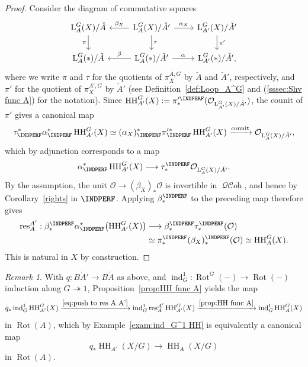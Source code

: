 \documentclass[12pt, oneside]{amsart}
\numberwithin{equation}{section}
\theoremstyle{remark}
\newtheorem{remark}[subsubsection]{Remark}
\theoremstyle{plain}
\DeclareMathOperator{\QCOH}{\mathcal{QC}\textit{oh}}
\newcommand{\Loop}{\operatorname{L}}
\newcommand{\OO}{\mathcal{O}}
\newcommand{\HH}{\operatorname{HH}}
\newcommand{\Rot}{\operatorname{Rot}}
\begin{document}
\begin{proof}
Consider the diagram of commutative squares
\[\begin{tikzcd}
  \Loop_A^G(X)/\check{A} \ar[swap]{d}{\pi}
  & \Loop_A^G(X)/\check{A}' \ar{d}{\tau}\ar[swap]{l}{\beta_X}\ar{r}{\alpha_X}
  & \Loop_{A'}^G(X)/\check{A}' \ar{d}{\pi'}
  \\
  \Loop_A^G(*)/\check{A}
  & \Loop_A^G(*)/\check{A}' \ar[swap]{l}{\beta}\ar{r}{\alpha}
  & \Loop_{A'}^G(*)/\check{A}',
\end{tikzcd}\]
where we write $\pi$ and $\tau$ for the quotients of $\pi_X^{A,G}$ by $\check{A}$ and $\check{A}'$, respectively, and $\pi'$ for the quotient of $\pi_X^{A',G}$ by $\check{A}'$ (see Definition~\ref{def:Loop_A^G} and (\ref{sssec:Shv func A}) for the notation).
Since $\HH_{A'}^G(X) := \pi'^{\INDPERF}_*(\OO_{\Loop_{A'}^G(X)/\check{A}'})$, the counit of $\pi'$ gives a canonical map
\[
  \tau^*_{\INDPERF} \alpha^*_{\INDPERF} \HH_{A'}^G(X) \simeq
  (\alpha_X)^*_{\INDPERF} \pi'^{*}_{\INDPERF} \HH_{A'}^G(X) \xrightarrow{\mathrm{counit}}
  \OO_{\Loop_A^G(X)/\check{A}'},
\]
which by adjunction corresponds to a map
\[
  \alpha^*_{\INDPERF} \HH_{A'}^G(X) \longrightarrow
  \tau_*^{\INDPERF} \OO_{\Loop_A^G(X)/\check{A}'}.
\]
By the assumption, the unit $\OO \to (\beta_X)_*\OO$ is invertible in $\QCOH$, and hence by Corollary~\ref{rights} in $\INDPERF$.
Applying $\beta_*^{\INDPERF}$ to the preceding map therefore gives
\[\begin{aligned}
  \operatorname{res}_{A}^{A'} :
  \beta_*^{\INDPERF}\alpha^*_{\INDPERF} \bigl( \HH_{A'}^G(X) \bigr)
  &\longrightarrow \beta_*^{\INDPERF}\tau_*^{\INDPERF} (\OO) \\
  &\simeq \pi_*^{\INDPERF}(\beta_X)_*^{\INDPERF} (\OO)
  \simeq \HH_A^G(X).
\end{aligned}\]
This is natural in $X$ by construction.
\end{proof}

\begin{remark}
With $q : B\check{A}' \to B\check{A}$ as above, and $\operatorname{ind}_G^1 : \Rot^G(-) \to \Rot(-)$ induction along $G \twoheadrightarrow 1$, Proposition~\ref{prop:HH func A} yields the map
\[
  q_* \operatorname{ind}_G^1 \HH_{A'}^G(X)
  \xrightarrow{\eqref{eq:push to res A A'}}
  \operatorname{ind}_G^1 \operatorname{res}_A^{A'} \HH_{A'}^G(X)
  \xrightarrow{\ref{prop:HH func A}} \operatorname{ind}_G^1 \HH_{A}^G(X)
\]
in $\Rot(A)$, which by Example~\ref{exam:ind_G^1 HH} is equivalently a canonical map
\[
  q_* \HH_{A'}(X/G) \to \HH_A(X/G)
\]
in $\Rot(A)$.
\end{remark}
\end{document}
